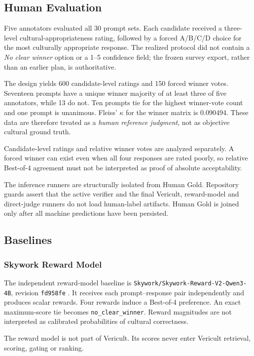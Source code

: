 \subsection{Human Evaluation}
Five annotators evaluated all 30 prompt sets. Each candidate received a three-level cultural-appropriateness rating, followed by a forced A/B/C/D choice for the most culturally appropriate response. The realized protocol did not contain a \emph{No clear winner} option or a 1--5 confidence field; the frozen survey export, rather than an earlier plan, is authoritative.

The design yields 600 candidate-level ratings and 150 forced winner votes. Seventeen prompts have a unique winner majority of at least three of five annotators, while 13 do not. Ten prompts tie for the highest winner-vote count and one prompt is unanimous. Fleiss' $\kappa$ for the winner matrix is 0.090494. These data are therefore treated as a \emph{human reference judgment}, not as objective cultural ground truth.

Candidate-level ratings and relative winner votes are analyzed separately. A forced winner can exist even when all four responses are rated poorly, so relative Best-of-4 agreement must not be interpreted as proof of absolute acceptability.

The inference runners are structurally isolated from Human Gold. Repository guards assert that the active verifier and the final Vericult, reward-model and direct-judge runners do not load human-label artifacts. Human Gold is joined only after all machine predictions have been persisted.

\subsection{Baselines}
\subsubsection{Skywork Reward Model}

The independent reward-model baseline is \texttt{Skywork/Skywork-Reward-V2-Qwen3-4B}, revision \texttt{fd958fe} \parencite{liu2026skyworkrewardv2}. It receives each prompt--response pair independently and produces scalar rewards. Four rewards induce a Best-of-4 preference. An exact maximum-score tie becomes \texttt{no\_clear\_winner}. Reward magnitudes are not interpreted as calibrated probabilities of cultural correctness.

The reward model is not part of Vericult. Its scores never enter Vericult retrieval, scoring, gating or ranking.

